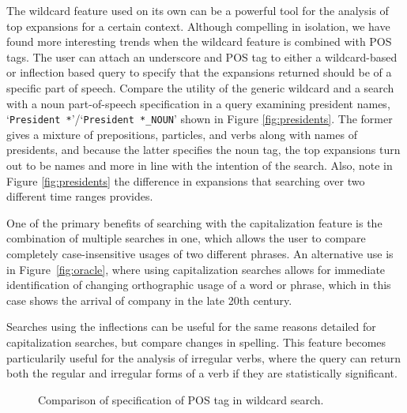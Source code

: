 \documentclass[11pt]{article}
\newcommand{\query}[1]{\texttt{#1}}
\begin{document}
The wildcard feature used on its own can be a powerful tool for the analysis of top expansions for a certain context.  Although compelling in isolation, we have found more interesting trends when the wildcard feature is combined with POS tags. The user can attach an underscore and POS tag to either a wildcard-based or inflection based query to specify that the expansions returned should be of a specific part of speech. Compare the utility of the generic wildcard and a search with a noun part-of-speech specification in a query examining president names, `\query{President *}'/`\query{President *\_NOUN}' shown in Figure \ref{fig:presidents}. The former gives a mixture of prepositions, particles, and verbs along with names of presidents, and because the latter specifies the noun tag, the top expansions turn out to be names and more in line with the intention of the search. Also, note in Figure \ref{fig:presidents} the difference in expansions that searching over two different time ranges provides.

One of the primary benefits of searching with the capitalization feature is the combination of multiple searches in one, which allows the user to compare completely case-insensitive usages of two different phrases. An alternative use is in Figure~\ref{fig:oracle}, where using capitalization searches allows for immediate identification of changing orthographic usage of a word or phrase, which in this case shows the arrival of company in the late 20th century.

Searches using the inflections can be useful for the same reasons detailed for capitalization searches, but compare changes in spelling. This feature becomes particularily useful for the analysis of irregular verbs, where the query can return both the regular and irregular forms of a verb if they are statistically significant.
\begin{figure}
\vspace*{-1em}
\caption{\label{fig:light} Comparison of specification of POS tag in wildcard search.}
\end{figure}
\end{document}
